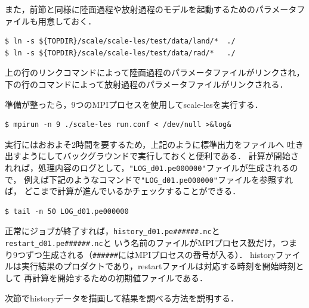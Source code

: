 また，前節と同様に陸面過程や放射過程のモデルを起動するためのパラメータファイルも用意しておく．

\begin{verbatim}
$ ln -s ${TOPDIR}/scale/scale-les/test/data/land/*  ./
$ ln -s ${TOPDIR}/scale/scale-les/test/data/rad/*   ./
\end{verbatim}
上の行のリンクコマンドによって陸面過程のパラメータファイルがリンクされ，
下の行のコマンドによって放射過程のパラメータファイルがリンクされる．


準備が整ったら，9つのMPIプロセスを使用してscale-lesを実行する．
\begin{verbatim}
$ mpirun -n 9 ./scale-les run.conf < /dev/null >&log&
\end{verbatim}


実行にはおおよそ2時間を要するため，上記のように標準出力をファイルへ
吐き出すようにしてバックグラウンドで実行しておくと便利である．
計算が開始されれば，処理内容のログとして，\verb|"LOG_d01.pe000000"|ファイルが生成されるので，
例えば下記のようなコマンドで\verb|"LOG_d01.pe000000"|ファイルを参照すれば，
どこまで計算が進んでいるかチェックすることができる．

\begin{verbatim}
$ tail -n 50 LOG_d01.pe000000
\end{verbatim}


正常にジョブが終了すれば，\verb|history_d01.pe######.nc|と\verb|restart_d01.pe######.nc|と
いう名前のファイルがMPIプロセス数だけ，つまり9つずつ生成される（\verb|######|にはMPIプロセスの番号が入る）．
historyファイルは実行結果のプロダクトであり，restartファイルは対応する時刻を開始時刻として
再計算を開始するための初期値ファイルである．

次節でhistoryデータを描画して結果を調べる方法を説明する．



